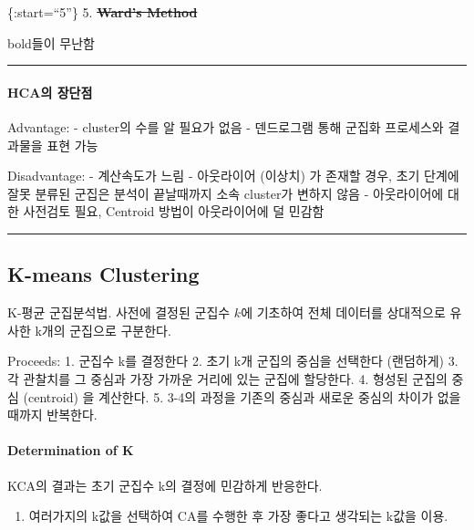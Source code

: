 \documentclass[
]{book}
\providecommand{\tightlist}{%
  \setlength{\itemsep}{0pt}\setlength{\parskip}{0pt}}
\begin{document}
{{{\{:start=``5''\}
5. \textbf{\sout{Ward's Method}}

bold들이 무난함

\begin{center}\rule{0.5\linewidth}{0.5pt}\end{center}

\hypertarget{hcauxc758-uxc7a5uxb2e8uxc810}{%
\paragraph{HCA의 장단점}\label{hcauxc758-uxc7a5uxb2e8uxc810}}

Advantage:
- cluster의 수를 알 필요가 없음
- 덴드로그램 통해 군집화 프로세스와 결과물을 표현 가능

Disadvantage:
- 계산속도가 느림
- 아웃라이어 (이상치) 가 존재할 경우, 초기 단계에 잘못 분류된 군집은 분석이 끝날때까지 소속 cluster가 변하지 않음
- 아웃라이어에 대한 사전검토 필요, Centroid 방법이 아웃라이어에 덜 민감함

\begin{center}\rule{0.5\linewidth}{0.5pt}\end{center}

\hypertarget{k-means-clustering}{%
\subsection{K-means Clustering}\label{k-means-clustering}}

K-평균 군집분석법. 사전에 결정된 군집수 \(k\)에 기초하여 전체 데이터를 상대적으로 유사한 k개의 군집으로 구분한다.

Proceeds:
1. 군집수 k를 결정한다
2. 초기 k개 군집의 중심을 선택한다 (랜덤하게)
3. 각 관찰치를 그 중심과 가장 가까운 거리에 있는 군집에 할당한다.
4. 형성된 군집의 중심 (centroid) 을 계산한다.
5. 3-4의 과정을 기존의 중심과 새로운 중심의 차이가 없을 때까지 반복한다.

\hypertarget{determination-of-k}{%
\paragraph{Determination of K}\label{determination-of-k}}

KCA의 결과는 초기 군집수 k의 결정에 민감하게 반응한다.

\begin{enumerate}
\def\labelenumi{\arabic{enumi}.}
\tightlist
\item
  여러가지의 k값을 선택하여 CA를 수행한 후 가장 좋다고 생각되는 k값을 이용.


\end{enumerate}}}}
\end{document}
